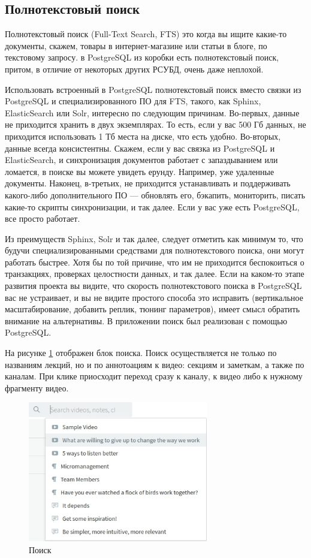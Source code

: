 \FloatBarrier

\subsection{Полнотекстовый поиск}

Полнотекстовый поиск (Full-Text Search, FTS) это когда вы ищите какие-то документы,
скажем, товары в интернет-магазине или статьи в блоге, по текстовому запросу. в PostgreSQL из коробки есть
полнотекстовый поиск, притом, в отличие от некоторых других РСУБД, очень даже неплохой.

Использовать встроенный в PostgreSQL полнотекстовый поиск вместо связки из PostgreSQL и специализированного ПО для FTS,
такого, как Sphinx, ElasticSearch или Solr, интересно по следующим причинам.
Во-первых, данные не приходится хранить в двух экземплярах. То есть, если у вас 500 Гб данных, не приходится использовать
1 Тб места на диске, что есть удобно. Во-вторых, данные всегда консистентны.
Скажем, если у вас связка из PostgreSQL и ElasticSearch, и синхронизация документов работает с запаздыванием
или ломается, в поиске вы можете увидеть ерунду. Например, уже удаленные документы.
Наконец, в-третьих, не приходится устанавливать и поддерживать какого-либо дополнительного ПО —
обновлять его, бэкапить, мониторить, писать какие-то скрипты синхронизации, и так далее.
Если у вас уже есть PostgreSQL, все просто работает.

Из преимуществ Sphinx, Solr и так далее, следует отметить как минимум то, что будучи специализированными
средствами для полнотекстового поиска, они могут работать быстрее. Хотя бы по той причине, что им не приходится
беспокоиться о транзакциях, проверках целостности данных, и так далее. Если на каком-то этапе развития проекта
вы видите, что скорость полнотекстового поиска в PostgreSQL вас не устраивает, и вы не видите простого способа
это исправить (вертикальное масштабирование, добавить реплик, тюнинг параметров), имеет смысл обратить внимание
на альтернативы. В приложении поиск был реализован с помощью PostgreSQL.

На рисунке \ref{search} отображен блок поиска. Поиск осуществляется не только по названиям лекций,
но и по аннотоациям к видео: секциям и заметкам, а также по каналам. При клике приосходит переход
сразу к каналу, к видео либо к нужному фрагменту видео.

\begin{figure}
  \centering
  \includegraphics[width=0.7\textwidth]{images/search.jpg}
  \caption{Поиск}\label{search}
\end{figure}

